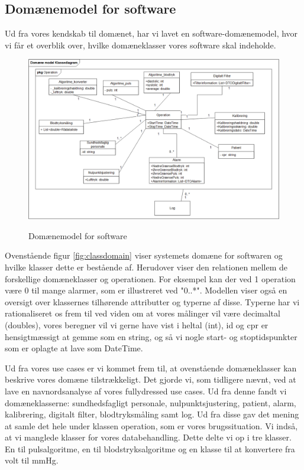\subsection{Domænemodel for software}
  
Ud fra vores kendskab til domænet, har vi lavet en software-domænemodel, hvor vi får et overblik over, hvilke domæneklasser vores software skal indeholde. 

\clearpage

\begin{figure}[h!]
	\centering
	\includegraphics[width=1\linewidth]{Arkitektur_og_design/Softwarearkitektur/classdomain}
	\label{fig:classdomain}
	\caption{Domænemodel for software}
\end{figure}

Ovenstående figur \vref{fig:classdomain} viser systemets domæne for softwaren og hvilke klasser dette er bestående af.  Herudover viser den relationen mellem de forskellige domæneklasser og operationen. For eksempel kan der ved 1 operation være 0 til mange alarmer, som er illustreret ved "0..*". Modellen viser også en oversigt over klassernes tilhørende attributter og typerne af disse. Typerne har vi rationaliseret os frem til ved viden om at vores målinger vil være decimaltal (doubles), vores beregner vil vi gerne have vist i heltal (int), id og cpr er hensigtmæssigt at gemme som en string, og så vi nogle start- og stoptidspunkter som er oplagte at lave som DateTime. 

Ud fra vores use cases er vi kommet frem til, at ovenstående domæneklasser kan beskrive vores domæne tilstrækkeligt. Det gjorde vi, som tidligere nævnt, ved at lave en navnordsanalyse af vores fullydressed use cases. Ud fra denne fandt vi domæneklasserne: sundhedsfagligt personale, nulpunktsjustering, patient, alarm, kalibrering, digitalt filter, blodtryksmåling samt log. Ud fra disse gav det mening at samle det hele under klassen operation, som er vores brugssituation. Vi indså, at vi manglede klasser for vores databehandling. Dette delte vi op i tre klasser. En til pulsalgoritme, en til blodstryksalgoritme og en klasse til at konvertere fra volt til mmHg. 

